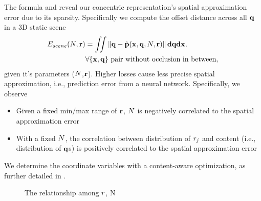 
The formula  and  reveal our concentric representation's spatial approximation error due to its sparsity. Specifically we compute the offset distance across all $\mathbf{q}$ in a 3D static scene
\begin{equation}
\begin{aligned}
E_{scene}(N, \mathbf{r})  &= \iint \left\lVert\mathbf{q}-\hat{\mathbf{p}}(\mathbf{x},\mathbf{q}, N, \mathbf{r})\right\rVert \mathbf{d}\mathbf{q} \mathbf{d}\mathbf{x},\\
&\forall \{\mathbf{x}, \mathbf{q}\} \text{ pair without occlusion in between},
\label{eq:sparseError}
\end{aligned}
\end{equation}
given it's parameters ($N$,$\mathbf{r}$). Higher losses cause less precise spatial approximation, i.e., prediction error from a neural network.
Specifically, we observe
\begin{itemize}
    \item Given a fixed min/max range of $\mathbf{r}$, $N$ is negatively correlated to the spatial approximation error
    \item With a fixed $N$, the correlation between distribution of $r_j$ and content (i.e., distribution of $\mathbf{q}$s) is positively correlated to the spatial approximation error
\end{itemize}
We determine the coordinate variables with a content-aware optimization, as further detailed in .

\begin{figure}
    \centering
    \caption{The relationship among $r$, N}
    \label{fig:intersection}
\end{figure}

